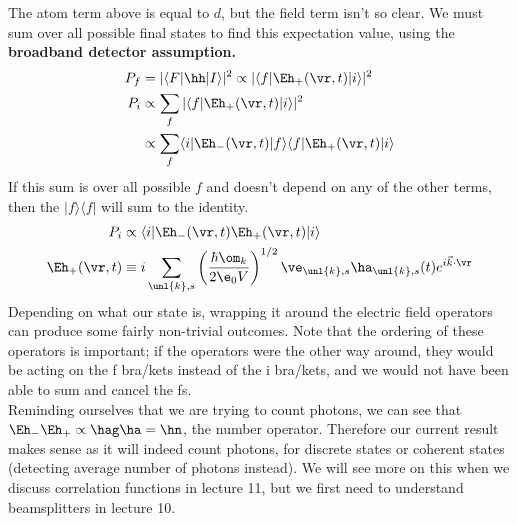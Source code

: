 \documentclass[a4paper, 11pt, normalem]{report}
\begin{document}
The atom term above is equal to $d$, but the field term isn't so clear. 
We must sum over all possible final states to find this expectation value, using the \textbf{broadband detector assumption.}
\begin{align}
    P_f &= |\langle F|\hh|I\rangle|^2 \propto |\langle f|\Eh_+(\vr,t)|i\rangle|^2 \\
    P_i &\propto \sum_f |\langle f|\Eh_+(\vr,t)|i\rangle|^2 \\
        &\propto \sum_f \langle i|\Eh_-(\vr,t)|f\rangle\langle f|\Eh_+(\vr,t)|i\rangle
\end{align}
If this sum is over all possible $f$ and doesn't depend on any of the other terms, then the $|f\rangle\langle f|$ will sum to the identity.
\begin{align}
    P_i &\propto \langle i|\Eh_-(\vr,t)\Eh_+(\vr,t)|i\rangle \\
    \Eh_+(\vr,t) &\equiv i\sum_{\unl{k},s}\left(\frac{\hbar\om_k}{2\e_0V}\right)^{1/2}\ve_{\unl{k},s}\ha_{\unl{k},s}(t)e^{i\vec{k}\cdot\vr} 
\end{align}
Depending on what our state is, wrapping it around the electric field operators can produce some fairly non-trivial outcomes.
Note that the ordering of these operators is important; if the operators were the other way around, they would be acting on the f bra/kets instead of the i bra/kets, and we would not have been able to sum and cancel the fs.\\
Reminding ourselves that we are trying to count photons, we can see that $\Eh_-\Eh_+ \propto \hag\ha = \hn$, the number operator. 
Therefore our current result makes sense as it will indeed count photons, for discrete states or coherent states (detecting average number of photons instead).
We will see more on this when we discuss correlation functions in lecture 11, but we first need to understand beamsplitters in lecture 10.
\end{document}
